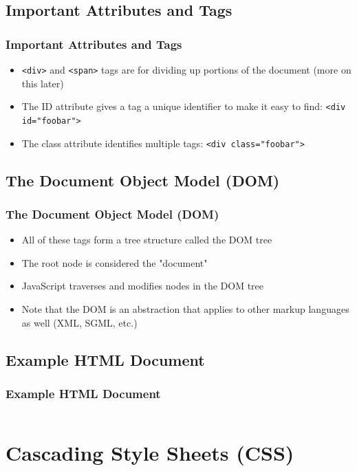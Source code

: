 \documentclass[10pt]{beamer}
\begin{document}
\subsection{Important Attributes and Tags}
\frame
{
  \frametitle{Important Attributes and Tags}

  \begin{itemize}
    \item \lstinline|<div>| and \lstinline|<span>| tags are for dividing up portions of the document (more on this later)
    \item The ID attribute gives a tag a unique identifier to make it easy to find: \lstinline|<div id="foobar">|
    \item The class attribute identifies multiple tags: \lstinline|<div class="foobar">|
  \end{itemize}
}

\subsection{The Document Object Model (DOM)}
\frame
{
  \frametitle{The Document Object Model (DOM)}

  \begin{itemize}
    \item All of these tags form a tree structure called the DOM tree
    \item The root node is considered the "document"
    \item JavaScript traverses and modifies nodes in the DOM tree
    \item Note that the DOM is an abstraction that applies to other markup languages as well (XML, SGML, etc.)
  \end{itemize}
}

\subsection{Example HTML Document}
\begin{frame}[fragile]
  \frametitle{Example HTML Document}

  \inputminted{html}{./code/html_example.html}
\end{frame}

\section{Cascading Style Sheets (CSS)}
\end{document}
